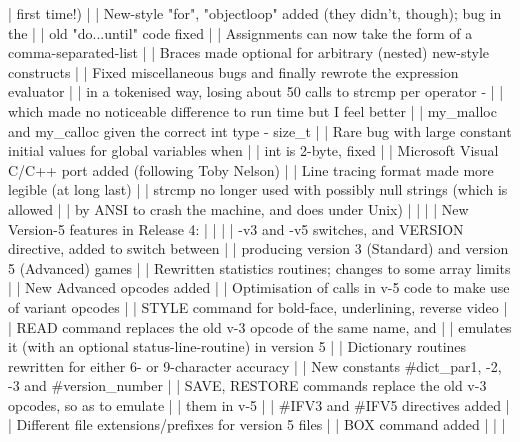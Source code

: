 |       first time!)                                                        |
|     New-style "for", "objectloop" added (they didn't, though); bug in the |
|       old "do...until" code fixed                                         |
|     Assignments can now take the form of a comma-separated-list           |
|     Braces made optional for arbitrary (nested) new-style constructs      |
|     Fixed miscellaneous bugs and finally rewrote the expression evaluator |
|       in a tokenised way, losing about 50 calls to strcmp per operator -  |
|       which made no noticeable difference to run time but I feel better   |
|     my_malloc and my_calloc given the correct int type - size_t           |
|     Rare bug with large constant initial values for global variables when |
|       int is 2-byte, fixed                                                |
|     Microsoft Visual C/C++ port added (following Toby Nelson)             |
|     Line tracing format made more legible (at long last)                  |
|     strcmp no longer used with possibly null strings (which is allowed    |
|       by ANSI to crash the machine, and does under Unix)                  |
|                                                                           |
|   New Version-5 features in Release 4:                                    |
|                                                                           |
|     -v3 and -v5 switches, and VERSION directive, added to switch between  |
|       producing version 3 (Standard) and version 5 (Advanced) games       |
|     Rewritten statistics routines; changes to some array limits           |
|     New Advanced opcodes added                                            |
|     Optimisation of calls in v-5 code to make use of variant opcodes      |
|     STYLE command for bold-face, underlining, reverse video               |
|     READ command replaces the old v-3 opcode of the same name, and        |
|       emulates it (with an optional status-line-routine) in version 5     |
|     Dictionary routines rewritten for either 6- or 9-character accuracy   |
|     New constants #dict_par1, -2, -3 and #version_number                  |
|     SAVE, RESTORE commands replace the old v-3 opcodes, so as to emulate  |
|       them in v-5                                                         |
|     #IFV3 and #IFV5 directives added                                      |
|     Different file extensions/prefixes for version 5 files                |
|     BOX command added                                                     |
|                                                                           |
